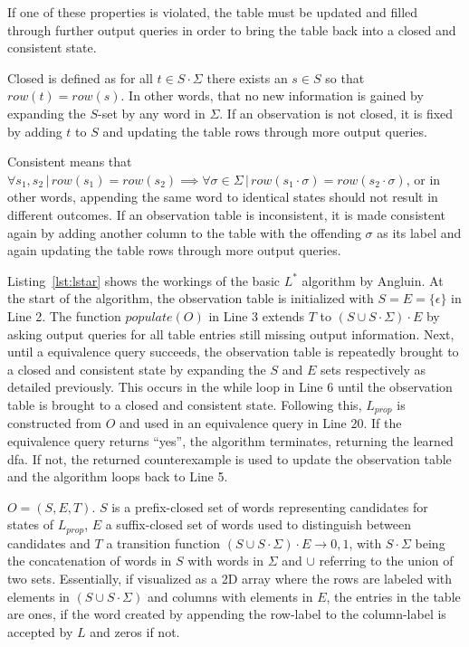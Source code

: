If one of these properties is violated, the table must be updated and filled through further output queries in order to bring the table back into a closed and consistent state. 

\iffalse
Closed is defined as for all $t \in S \cdot \Sigma$ there exists an $s \in S$ so that $row(t) = row(s)$. In other words, that no new information is gained by expanding the $S$-set by any word in $\Sigma$. If an observation is not closed, it is fixed by adding $t$ to $S$ and updating the table rows through more output queries. 

Consistent means that $\forall s_1, s_2 \,|\, row(s_1) = row(s_2) \implies \forall \sigma \in \Sigma \,|\, row(s_1 \cdot \sigma) = row(s_2 \cdot \sigma)$, or in other words, appending the same word to identical states should not result in different outcomes. If an observation table is inconsistent, it is made consistent again by adding another column to the table with the offending $\sigma$ as its label and again updating the table rows through more output queries. 


Listing~\ref{lst:lstar} shows the workings of the basic $L^*$ algorithm by Angluin. At the start of the algorithm, the observation table is initialized with $S = E = \{\epsilon\}$ in Line 2. The function $populate(O)$ in Line 3 extends $T$ to $(S \cup S \cdot \Sigma) \cdot E$ by asking output queries for all table entries still missing output information. Next, until a equivalence query succeeds, the observation table is repeatedly brought to a closed and consistent state by expanding the $S$ and $E$ sets respectively as detailed previously. This occurs in the while loop in Line 6 until the observation table is brought to a closed and consistent state. Following this, $L_{prop}$ is constructed from $O$ and used in an equivalence query in Line 20. If the equivalence query returns ``yes'', the algorithm terminates, returning the learned \ac{dfa}. If not, the returned counterexample is used to update the observation table and the algorithm loops back to Line 5. 


$O = (S,E,T)$. $S$ is a prefix-closed set of words representing candidates for states of $L_{prop}$, $E$ a suffix-closed set of words used to distinguish between candidates and $T$ a transition function $(S \cup S \cdot \Sigma) \cdot E \rightarrow {0,1}$, with $S \cdot \Sigma$ being the concatenation of words in $S$ with words in $\Sigma$ and $\cup$ referring to the union of two sets. Essentially, if visualized as a 2D array where the rows are labeled with elements in $(S \cup S \cdot \Sigma)$ and columns with elements in $E$, the entries in the table are ones, if the word created by appending the row-label to the column-label is accepted by $L$ and zeros if not. 

